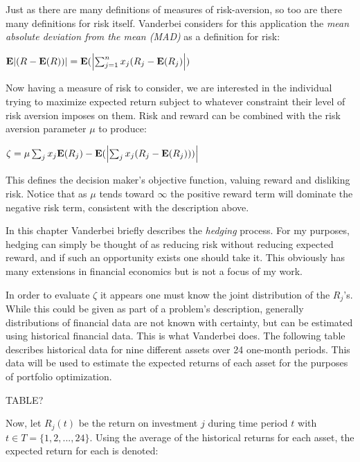 \documentclass{article}
\begin{document}
Just as there are many definitions of measures of risk-aversion, so too are there many definitions for risk itself. Vanderbei considers for this application the \textit{mean absolute deviation from the mean (MAD)} as a definition for risk:

\begin{center}
    $\mathbf{E}\abs{(R - \mathbf{E}(R))} = \mathbf{E}(\abs{\sum_{j=1}^{n} x_j(R_j-\mathbf{E}(R_j)})$
\end{center}

Now having a measure of risk to consider, we are interested in the individual trying to maximize expected return subject to whatever constraint their level of risk aversion imposes on them. Risk and reward can be combined with the risk aversion parameter $\mu$ to produce:

\begin{center}
    $\zeta = \mu\sum_{j} x_j\mathbf{E}(R_j) - \mathbf{E}(\abs{\sum_{j} x_j(R_j-\mathbf{E}(R_j)))}$
\end{center}

This defines the decision maker's objective function, valuing reward and disliking risk. Notice that as $\mu$ tends toward $\infty$ the positive reward term will dominate the negative risk term, consistent with the description above. 

\begin{notes}
\item In this chapter Vanderbei briefly describes the \textit{hedging} process. For my purposes, hedging can simply be thought of as reducing risk without reducing expected reward, and if such an opportunity exists one should take it. This obviously has many extensions in financial economics but is not a focus of my work.
\end{notes}

In order to evaluate $\zeta$ it appears one must know the joint distribution of the $R_j$'s. While this could be given as part of a problem's description, generally distributions of financial data are not known with certainty, but can be estimated using historical financial data. This is what Vanderbei does. The following table describes historical data for nine different assets over 24 one-month periods. This data will be used to estimate the expected returns of each asset for the purposes of portfolio optimization.

TABLE?

Now, let $R_j(t)$ be the return on investment $j$ during time period $t$ with $t \in T = \{1,2,...,24\}$. Using the average of the historical returns for each asset, the expected return for each is denoted:
\end{document}
